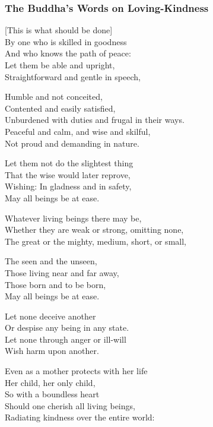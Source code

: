 \subsubsection{The Buddha's Words on Loving-Kindness}

\begin{leader}
\end{leader}


[This is what should be done]\\
By one who is skilled in goodness\\
And who knows the path of peace:\\
Let them be able and upright,\\
Straightforward and gentle in speech,

Humble and not conceited,\\
Contented and easily satisfied,\\
Unburdened with duties and frugal in their ways.\\
Peaceful and calm, and wise and skilful,\\
Not proud and demanding in nature.

Let them not do the slightest thing\\
That the wise would later reprove,\\
Wishing: In gladness and in safety,\\
May all beings be at ease.

Whatever living beings there may be,\\
Whether they are weak or strong, omitting none,\\
The great or the mighty, medium, short, or small,

The seen and the unseen,\\
Those living near and far away,\\
Those born and to be born,\\
May all beings be at ease.

Let none deceive another\\
Or despise any being in any state.\\
Let none through anger or ill-will\\
Wish harm upon another.

Even as a mother protects with her life\\
Her child, her only child,\\
So with a boundless heart\\
Should one cherish all living beings,\\
Radiating kindness over the entire world:

